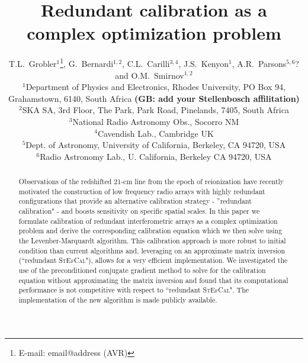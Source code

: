 \documentclass[useAMS,usenatbib]{mn2e}
\title[Redundant interferometric calibration as a complex optimization problem]{Redundant calibration as a complex optimization problem}
\author[T.L.~Grobler et al.]{T.L.~Grobler$^{1}$\thanks{E-mail: email@address (AVR)}, G.~Bernardi$^{1,2}$, C.L.~Carilli$^{3,4}$, J.S.~Kenyon$^{1}$, A.R.~Parsons$^{5,6}$? \newauthor and O.M.~Smirnov$^{1,2}$\\
$^{1}$Department of Physics and Electronics, Rhodes University, PO Box 94, Grahamstown, 6140, South Africa {\bf (GB: add your Stellenbosch affilitation)}\\
$^{2}$SKA SA, 3rd Floor, The Park, Park Road, Pinelands, 7405, South Africa\\
$^{3}$National Radio Astronomy Obs., Socorro NM\\
$^{4}$Cavendish Lab., Cambridge UK\\
$^{5}$Dept. of Astronomy, University of California, Berkeley, CA 94720, USA\\
$^{6}$Radio Astronomy Lab., U. California, Berkeley CA 94720, USA}
\begin{document}

\pagerange{\pageref{firstpage}--\pageref{lastpage}} 

\maketitle

\label{firstpage}

\begin{abstract}
Observations of the redshifted 21-cm line from the epoch of reionization have recently motivated the construction of low frequency radio arrays with highly redundant configurations that provide an alternative calibration strategy - ''redundant calibration" - and boosts sensitivity on specific spatial scales. In this paper we formulate calibration of redundant interferometric arrays as a complex optimization problem \citep[i.e.,][]{Smirnov2015} and derive the corresponding calibration equation which we then solve using the Levenber-Marquardt algorithm. This calibration approach is more robust to initial condition than current algorithms and, leveraging on an approximate matrix inversion (``redundant \textsc{StEfCal}"), allows for a very efficient implementation. We investigated the use of the preconditioned conjugate gradient method to solve for the calibration equation without approximating the matrix inversion and found that its computational performance is not competitive with respect to ``redundant \textsc{StEfCal}". The implementation of the new algorithm is made publicly available.

\end{abstract}
\end{document}
